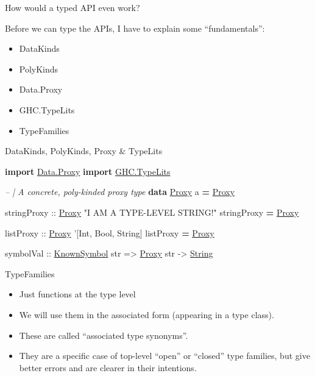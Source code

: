 \documentclass[ignorenonframetext,]{beamer}
\newenvironment{Shaded}{}{}
\newcommand{\KeywordTok}[1]{\textcolor[rgb]{0.26,0.66,0.93}{\textbf{{#1}}}}
\newcommand{\DataTypeTok}[1]{\underline{{#1}}}
\newcommand{\CharTok}[1]{\textcolor[rgb]{0.02,0.61,0.04}{{#1}}}
\newcommand{\StringTok}[1]{\textcolor[rgb]{0.02,0.61,0.04}{{#1}}}
\newcommand{\CommentTok}[1]{\textcolor[rgb]{0.00,0.40,1.00}{\textit{{#1}}}}
\newcommand{\OtherTok}[1]{{#1}}
\newcommand{\FunctionTok}[1]{\textcolor[rgb]{1.00,0.58,0.35}{\textbf{{#1}}}}
\newcommand{\NormalTok}[1]{{#1}}
\begin{document}
\begin{frame}{How would a typed API even work?}

Before we can type the APIs, I have to explain some ``fundamentals'':

\begin{itemize}[<+->]
\itemsep1pt\parskip0pt
\item
  DataKinds
\item
  PolyKinds
\item
  Data.Proxy
\item
  GHC.TypeLits
\item
  TypeFamilies
\end{itemize}

\end{frame}

\begin{frame}[fragile]{DataKinds, PolyKinds, Proxy \& TypeLits}

\begin{Shaded}
\begin{Highlighting}[]
\KeywordTok{import }\DataTypeTok{Data.Proxy}
\KeywordTok{import }\DataTypeTok{GHC.TypeLits}

\CommentTok{-- | A concrete, poly-kinded proxy type  }
\KeywordTok{data} \DataTypeTok{Proxy} \NormalTok{a }\FunctionTok{=} \DataTypeTok{Proxy}

\OtherTok{stringProxy ::} \DataTypeTok{Proxy} \StringTok{"I AM A TYPE-LEVEL STRING!"}
\NormalTok{stringProxy }\FunctionTok{=} \DataTypeTok{Proxy}

\OtherTok{listProxy ::} \DataTypeTok{Proxy} \CharTok{'[Int, Bool, String]}
\NormalTok{listProxy }\FunctionTok{=} \DataTypeTok{Proxy}

\OtherTok{symbolVal ::} \DataTypeTok{KnownSymbol} \NormalTok{str }\OtherTok{=>} \DataTypeTok{Proxy} \NormalTok{str }\OtherTok{->} \DataTypeTok{String}
\end{Highlighting}
\end{Shaded}

\end{frame}

\begin{frame}{TypeFamilies}

\begin{itemize}[<+->]
\itemsep1pt\parskip0pt
\item
  Just functions at the type level
\item
  We will use them in the associated form (appearing in a type class).
\item
  These are called ``associated type synonyms''.
\item
  They are a specific case of top-level ``open'' or ``closed'' type
  families, but give better errors and are clearer in their intentions.
\end{itemize}

\end{frame}
\end{document}
